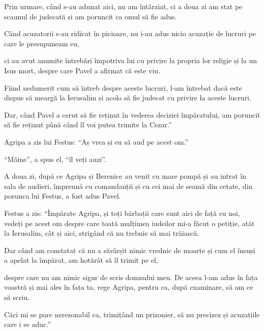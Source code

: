 {Prin urmare, când s-au adunat aici, nu am întârziat, ci a doua zi am stat pe scaunul de judecată și am poruncit ca omul să fie adus.

Când acuzatorii s-au ridicat în picioare, nu i-au adus nicio acuzație de lucruri pe care le presupuneam eu,

ci au avut anumite întrebări împotriva lui cu privire la propria lor religie și la un Isus mort, despre care Pavel a afirmat că este viu.

Fiind nedumerit cum să întreb despre aceste lucruri, l-am întrebat dacă este dispus să meargă la Ierusalim și acolo să fie judecat cu privire la aceste lucruri.

Dar, când Pavel a cerut să fie reținut în vederea deciziei împăratului, am poruncit să fie reținut până când îl voi putea trimite la Cezar.”


\par }{\PP {}Agripa a zis lui Festus: “Aș vrea și eu să aud pe acest om.”

\par }{\PP “Mâine”, a spus el, “îl veți auzi”.


\par }{\PP {}A doua zi, după ce Agripa și Berenice au venit cu mare pompă și au intrat în sala de audieri, împreună cu comandanții și cu cei mai de seamă din cetate, din porunca lui Festus, a fost adus Pavel.

Festus a zis: “Împărate Agripa, și toți bărbații care sunt aici de față cu noi, vedeți pe acest om despre care toată mulțimea iudeilor mi-a făcut o petiție, atât la Ierusalim, cât și aici, strigând că nu trebuie să mai trăiască.

Dar când am constatat că nu a săvârșit nimic vrednic de moarte și cum el însuși a apelat la împărat, am hotărât să îl trimit pe el,

despre care nu am nimic sigur de scris domnului meu. De aceea l-am adus în fața voastră și mai ales în fața ta, rege Agripa, pentru ca, după examinare, să am ce să scriu.

Căci mi se pare nerezonabil ca, trimițând un prizonier, să nu precizez și acuzațiile care i se aduc.”



\par }
